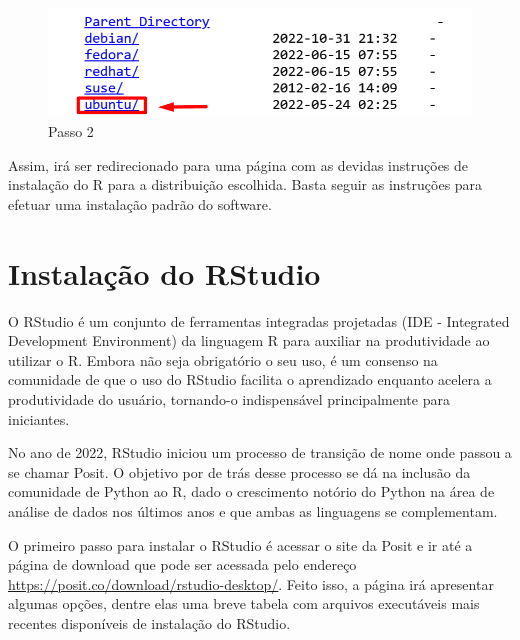 \documentclass[
  letterpaper,
  DIV=11,
  numbers=noendperiod]{scrreprt}
\begin{document}
\begin{figure}

{\centering \includegraphics[width=1\textwidth,height=\textheight]{./figuras_tutorialR/linux2.png}

}

\caption{Passo 2}

\end{figure}

Assim, irá ser redirecionado para uma página com as devidas instruções
de instalação do R para a distribuição escolhida. Basta seguir as
instruções para efetuar uma instalação padrão do software.

\hypertarget{instalauxe7uxe3o-do-rstudio}{%
\section{Instalação do RStudio}\label{instalauxe7uxe3o-do-rstudio}}

O RStudio é um conjunto de ferramentas integradas projetadas (IDE -
Integrated Development Environment) da linguagem R para auxiliar na
produtividade ao utilizar o R. Embora não seja obrigatório o seu uso, é
um consenso na comunidade de que o uso do RStudio facilita o aprendizado
enquanto acelera a produtividade do usuário, tornando-o indispensável
principalmente para iniciantes.

No ano de 2022, RStudio iniciou um processo de transição de nome onde
passou a se chamar Posit. O objetivo por de trás desse processo se dá na
inclusão da comunidade de Python ao R, dado o crescimento notório do
Python na área de análise de dados nos últimos anos e que ambas as
linguagens se complementam.

O primeiro passo para instalar o RStudio é acessar o site da Posit e ir
até a página de download que pode ser acessada pelo endereço
\url{https://posit.co/download/rstudio-desktop/}. Feito isso, a página
irá apresentar algumas opções, dentre elas uma breve tabela com arquivos
executáveis mais recentes disponíveis de instalação do RStudio.
\end{document}
